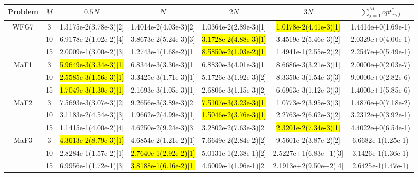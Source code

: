 \documentclass[a4paper,fleqn]{cas-dc}
\newcommand{\highlight}[1]{
	\begingroup
	\sethlcolor{Seashell}%
	\hl{#1}%
	\endgroup
}
\begin{document}
\begin{sloppypar}
\begin{table}[ht]
{\begin{tabular}{ccccccc}
				Problem  &{$M$} &$0.5N$  &$N$ &$2N$ &$3N$  &$\sum_{j=1}^{M}{opt^\ast_{\sim,j}}$ \\
				\midrule[0.35pt]
				
				\multirow{3}{*}{WFG7}&3 	&1.3175e-2(3.78e-3)[2]	&1.4014e-2(4.03e-3)[2]	&1.0364e-2(2.89e-3)[1]	&\highlight{1.0178e-2(4.41e-3)[1]} &1.4414e+0(1.69e-1)\\	
				\multirow{3}{*}{~}&10   &6.9178e-2(1.02e-2)[4]	&3.8673e-2(5.24e-3)[3]	&\highlight{3.1728e-2(4.88e-3)[1]}	&3.4519e-2(5.46e-3)[2] &2.0329e+0(4.00e-1)\\
				\multirow{3}{*}{~}&15 	&2.0009e-1(3.00e-2)[3]	&1.2743e-1(1.68e-2)[1]	&\highlight{8.5850e-2(1.03e-2)[1]}	&1.4941e-1(2.55e-2)[2] &2.2547e+0(5.49e-1)\\
				\hline
				
				\multirow{3}{*}{MaF1}&3		&\highlight{5.9649e-3(3.34e-3)[1]}	&6.8344e-3(3.30e-3)[1]	&6.8830e-3(4.01e-3)[1]	&8.6686e-3(3.21e-3)[1] &2.0000e+0(2.03e-7)\\
				\multirow{3}{*}{~}&10 		&\highlight{2.5585e-3(1.56e-3)[1]}	&3.3425e-3(1.71e-3)[1]	&5.1726e-3(1.92e-3)[2]	&8.3350e-3(1.54e-3)[3] &9.0000e+0(2.82e-6)\\
				\multirow{3}{*}{~}&15		&\highlight{1.7049e-3(1.30e-3)[1]}	&2.1693e-3(1.05e-3)[1]	&2.6806e-3(1.15e-3)[2]	&6.6963e-3(1.12e-3)[3] &1.4000e+1(5.85e-6)\\
				\hline
				
				
				
				
				
				\multirow{3}{*}{MaF2}&3 &7.5693e-3(3.07e-3)[2]	&9.2656e-3(3.89e-3)[2]	&\highlight{7.5107e-3(3.23e-3)[1]}	&1.0773e-2(3.95e-3)[3] &1.4876e+0(7.18e-2)\\
				\multirow{3}{*}{~}&10 &3.1183e-2(4.54e-3)[3]	&1.9662e-2(4.99e-3)[1]	&\highlight{1.5046e-2(3.76e-3)[1]}	&2.2763e-2(6.62e-3)[2] 	&3.2312e+0(3.92e-1)\\
				\multirow{3}{*}{~}&15 &1.1415e-1(4.00e-2)[4]	&4.6250e-2(9.24e-3)[3]	&3.2802e-2(7.63e-3)[2]	&\highlight{2.3201e-2(7.34e-3)[1]}  	&4.4022e+0(6.54e-1)\\
				\hline
				
				
				
				
				\multirow{3}{*}{MaF3}&3 &\highlight{4.3613e-2(8.79e-3)[1]}	&4.6854e-2(1.21e-2)[1]	&7.6649e-2(2.84e-2)[2]	&9.5601e-2(3.87e-2)[2]  &6.6682e-1(1.25e-1)	\\
				\multirow{3}{*}{~}&10  &2.8284e-1(1.57e-2)[1]	&\highlight{2.7640e-1(2.92e-2)[1]}	&5.0131e-1(2.38e-1)[2]	&2.5227e+1(6.83e+1)[3]  &3.1426e-1(1.36e-1)\\
				\multirow{3}{*}{~}&15 &6.9956e-1(1.72e-1)[3]	&\highlight{3.8188e-1(6.16e-2)[1]}	&4.6009e-1(1.96e-1)[2]	&2.1913e+2(9.50e+2)[4]  &2.6425e-1(1.47e-1)\\
				\hline
				

\end{tabular}}
\end{table}
\end{sloppypar}
\end{document}
